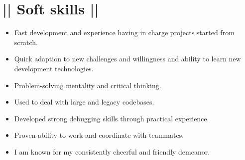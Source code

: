 \section*{|| Soft skills ||}
	\begin{itemize}
		\item Fast development and experience having in charge projects started from scratch.
		\item Quick adaption to new challenges and willingness and ability to learn new development technologies.
		\item Problem-solving mentality and critical thinking.
		\item Used to deal with large and legacy codebases.
		\item Developed strong debugging skills through practical experience.
		\item Proven ability to work and coordinate with teammates.
		\item I am known for my consistently cheerful and friendly demeanor.
	\end{itemize}